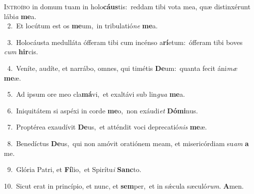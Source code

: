 \lettrine{\initial\textcolor{\initialcolor}{I}}{ntroíbo} in domum tuam in holo\-\textbf{cáus}\-tis:~\star reddam tibi vota mea, quæ distinxérunt lábi\textit{a} \textbf{me}\-a.\\
{\numbfont\textcolor{\numbcolor}{~2.}}~Et locútum est os \textbf{me}\-um,~\star in tribulatió\textit{ne} \textbf{me}\-a.\par
{\numbfont\textcolor{\numbcolor}{~3.}}~Holocáusta medulláta ófferam tibi cum incénso a\-\textbf{rí}\-etum:~\star ófferam tibi boves \textit{cum} \textbf{hir}\-cis.\par
{\numbfont\textcolor{\numbcolor}{~4.}}~Veníte, audíte, et narrábo, omnes, qui timétis \textbf{De}\-um:~\star quanta fecit áni\textit{mæ} \textbf{me}\-æ.\par
{\numbfont\textcolor{\numbcolor}{~5.}}~Ad ipsum ore meo cla\-\textbf{má}\-vi,~\star et exaltávi sub lin\textit{gua} \textbf{me}\-a.\par
{\numbfont\textcolor{\numbcolor}{~6.}}~Iniquitátem si aspéxi in corde \textbf{me}\-o,~\star non exáudi\textit{et} \textbf{Dó}\-\textbf{mi}nus.\par
{\numbfont\textcolor{\numbcolor}{~7.}}~Proptérea exaudívit \textbf{De}\-us,~\star et atténdit voci deprecatió\textit{nis} \textbf{me}\-æ.\par
{\numbfont\textcolor{\numbcolor}{~8.}}~Benedíctus \textbf{De}\-us,~\star qui non amóvit oratiónem meam, et misericórdiam su\textit{am} \textbf{a} me.\par
{\numbfont\textcolor{\numbcolor}{~9.}}~Glória Patri, et \textbf{Fí}\-lio,~\star et Spirítu\textit{i} \textbf{Sanc}\-to.\par
{\numbfont\textcolor{\numbcolor}{10.}}~Sicut erat in princípio, et nunc, et \textbf{sem}\-per,~\star et in sǽcula sæculó\-\textit{rum}\-. \textbf{A}\-men.\par
